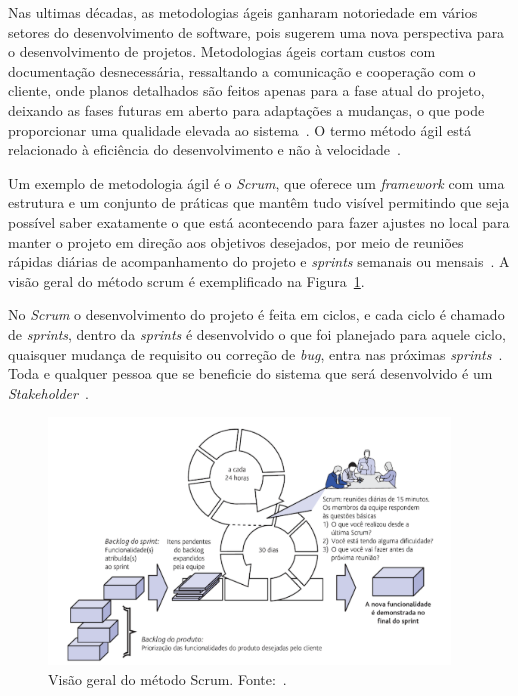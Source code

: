 Nas ultimas décadas, as metodologias ágeis ganharam notoriedade em vários setores do desenvolvimento de software, pois sugerem uma nova perspectiva para o desenvolvimento de projetos.
Metodologias ágeis cortam custos com documentação desnecessária, ressaltando a comunicação e cooperação com o cliente, onde planos detalhados são feitos apenas para a fase atual do projeto, deixando as fases futuras em aberto para adaptações a mudanças, o que pode proporcionar uma qualidade elevada ao sistema~\citep{sato2007uso}.
O termo método ágil está relacionado à eficiência do desenvolvimento e não à velocidade~\citep{prikladnicki2014metodos}.

Um exemplo de metodologia ágil é o \textit{Scrum}, que oferece um \textit{framework} com uma estrutura e um conjunto de práticas que mantêm tudo visível permitindo que seja possível saber exatamente o que está acontecendo para fazer ajustes no local para manter o projeto em direção aos objetivos desejados, por meio de reuniões rápidas diárias de acompanhamento do projeto e \textit{sprints} semanais ou mensais~\citep{schwaber2004agile}. 
A visão geral do método scrum é exemplificado na Figura~\ref{fig:scrum}.

No \textit{Scrum} o desenvolvimento do projeto é feita em ciclos, e cada ciclo é chamado de \textit{sprints}, dentro da \textit{sprints} é desenvolvido o que foi planejado para aquele ciclo, quaisquer mudança de requisito ou correção de \textit{bug}, entra nas próximas \textit{sprints}~\citep{pressman2016engenharia}.
Toda e qualquer pessoa que se beneficie do sistema que será desenvolvido é um \textit{Stakeholder}~\citep{pressman2016engenharia}.

\begin{figure}[H]
    \centering
    \includegraphics[width=0.95\textwidth]{img/scrum.PNG}
    \caption[Visão geral do método Scrum]{Visão geral do método Scrum. Fonte:~\cite{pressman2016engenharia}.}
    \label{fig:scrum}
\end{figure}

